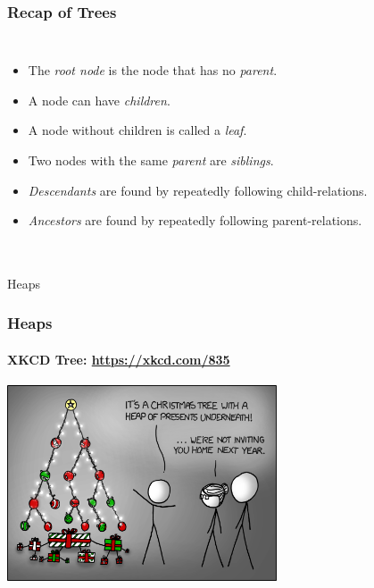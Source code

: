 \begin{frame}
	\frametitle{Recap of Trees}
	\begin{columns}[T]
		\begin{itemize}
			\item The \textit{root node} is the node that has no \textit{parent}.
			\item A node can have \textit{children}.
			\item A node without children is called a \textit{leaf}.
			\item Two nodes with the same \textit{parent} are \textit{siblings}.
			\item \textit{Descendants} are found by repeatedly following child-relations.
			\item \textit{Ancestors} are found by repeatedly following parent-relations.
		\end{itemize}
	\end{columns}
\end{frame}

\begin{frame}[fragile]\frametitle{}
\begin{center}
{\Large Heaps}
\end{center}

\end{frame}


\begin{frame}
	\frametitle{Heaps}
	\framesubtitle{XKCD Tree: \url{https://xkcd.com/835}}
	\begin{center}
		\includegraphics[width=0.6\textwidth]{images/tree.png}\\
	\end{center}
\end{frame}

